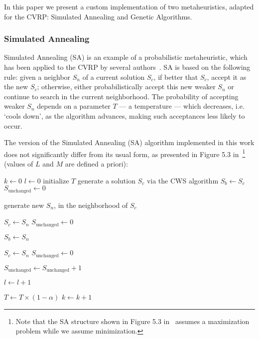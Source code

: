 In this paper we present a custom implementation of two metaheuristics, adapted 
for the CVRP: Simulated Annealing and Genetic Algorithms.\vertbreak

\subsubsection{Simulated Annealing}
\label{subsubsec:sim-anneal}

Simulated Annealing (SA) is an example of a probabilistic metaheuristic, which 
has been applied to the CVRP by several authors~\cite{Toth2002}. SA is based on 
the following rule: given a neighbor $S_n$ of a current solution $S_c$, if 
better that $S_c$, accept it as the new $S_c$; otherwise, either 
probabilistically accept this new weaker $S_n$ or continue to search in 
the current neighborhood. The probability of accepting weaker $S_n$ depends 
on a parameter $T$ --- a temperature --- which decreases, i.e. `cools down', as 
the algorithm advances, making such acceptances less likely to occur.\vertbreak

The version of the Simulated Annealing (SA) algorithm implemented in this work 
does not significantly differ from its usual form, as presented in Figure 5.3 
in~\cite{Michalewicz2004}\footnote{Note that the SA structure shown in Figure 
5.3 in~\cite{Michalewicz2004} assumes a maximization problem while we assume 
minimization.} (values of $L$ and $M$ are defined a priori):\vertbreak

\begin{algorithmic}[1]

\State $k \leftarrow 0$
\State $l \leftarrow 0$
\State initialize $T$
\State generate a solution $S_c$ via the CWS algorithm
\State $S_b \leftarrow S_c$
\State $S_{\text{unchanged}} \leftarrow 0$

\Repeat
\Repeat

\State generate new $S_n$, in the neighborhood of $S_c$


    \State $S_c \leftarrow S_n$
    \State $S_{\text{unchanged}} \leftarrow 0$


        \State $S_b \leftarrow S_n$

    \EndIf

\ElsIf {random[0,1) $< e^{\frac{d(S_c) - d(S_n)}{T}}$}

    \State $S_c \leftarrow S_n$
    \State $S_{\text{unchanged}} \leftarrow 0$

\Else

    \State $S_{\text{unchanged}} \leftarrow S_{\text{unchanged}} + 1$

\EndIf

\State $l \leftarrow l + 1$


\State $T \leftarrow T \times (1 - \alpha)$
\State $k \leftarrow k + 1$


\end{algorithmic}\vertbreak

